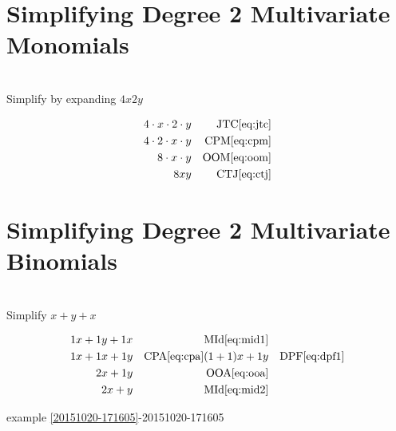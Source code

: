 \documentclass[20150903-160354-rs2.2-MarksMathNotebook.tex]{subfiles}
\begin{document}
\section{Simplifying Degree 2 Multivariate Monomials}

\begin{example}[id:20151018-161315] \label{20151018-161315} \hfill \\
Simplify by expanding $4x2y$

\soln

\solnsteps
\begin{align*}
4 \cdot x \cdot 2 \cdot y && \text{JTC} \eqref{eq:jtc} \\
4 \cdot 2 \cdot x \cdot y && \text{CPM} \eqref{eq:cpm} \\
8 \cdot x \cdot y && \text{OOM} \eqref{eq:oom} \\
8xy && \text{CTJ} \eqref{eq:ctj} 
\end{align*}
\end{example}



\section{Simplifying Degree 2 Multivariate Binomials}\label{Simplify! Degree 2 Multivariate Binomials}


\begin{example}[id:20151020-175447] \label{20151020-175447} \hfill \\
Simplify $x+y+x$

\soln

\solnsteps
\begin{align*}
1x+1y+1x && \text{MId} \eqref{eq:mid1} \\
1x+1x+1y && \text{CPA} \eqref{eq:cpa} 
(1+1)x + 1y && \text{DPF} \eqref{eq:dpf1} \\
2x+1y && \text{OOA} \eqref{eq:ooa} \\
2x+y && \text{MId} \eqref{eq:mid2} 
\end{align*}

\qdepend

\qdependlist
example \ref{20151020-171605}-20151020-171605

\end{example}
\end{document}
